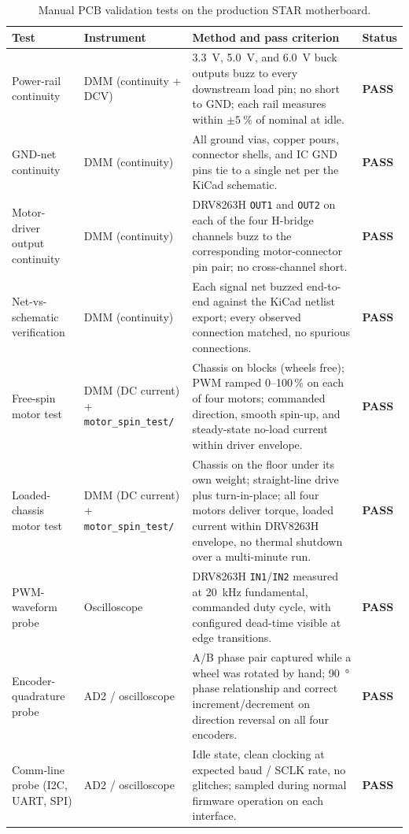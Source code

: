 \documentclass[11pt,letterpaper]{article}
\newcommand{\pass}{{\color{passgreen}\textbf{PASS}}}
\begin{document}
\begin{table}[H]
\centering
\caption{Manual PCB validation tests on the production STAR motherboard.}
\label{tab:pcbvalid}
\small
\setlength{\tabcolsep}{5pt}
\renewcommand{\arraystretch}{1.15}
\begin{tabularx}{\linewidth}{@{}%
  >{\raggedright\arraybackslash}p{3.0cm}%
  >{\raggedright\arraybackslash}p{3.0cm}%
  >{\raggedright\arraybackslash}X%
  >{\centering\arraybackslash}p{1.0cm}@{}}
\toprule
\textbf{Test} & \textbf{Instrument} & \textbf{Method and pass criterion} & \textbf{Status} \\
\midrule
Power-rail continuity
  & DMM (continuity + DCV)
  & \qty{3.3}{\volt}, \qty{5.0}{\volt}, and \qty{6.0}{\volt} buck outputs
    buzz to every downstream load pin; no short to GND; each rail measures
    within $\pm\qty{5}{\percent}$ of nominal at idle.
  & \pass{} \\[2pt]
GND-net continuity
  & DMM (continuity)
  & All ground vias, copper pours, connector shells, and IC GND pins tie
    to a single net per the KiCad schematic.
  & \pass{} \\[2pt]
Motor-driver output continuity
  & DMM (continuity)
  & DRV8263H \texttt{OUT1} and \texttt{OUT2} on each of the four H-bridge
    channels buzz to the corresponding motor-connector pin pair; no
    cross-channel short.
  & \pass{} \\[2pt]
Net-vs-schematic verification
  & DMM (continuity)
  & Each signal net buzzed end-to-end against the KiCad netlist export;
    every observed connection matched, no spurious connections.
  & \pass{} \\[2pt]
Free-spin motor test
  & DMM (DC current) + \texttt{motor\_spin\_test/}
  & Chassis on blocks (wheels free); PWM ramped 0--100\,\% on each of four
    motors; commanded direction, smooth spin-up, and steady-state no-load
    current within driver envelope.
  & \pass{} \\[2pt]
Loaded-chassis motor test
  & DMM (DC current) + \texttt{motor\_spin\_test/}
  & Chassis on the floor under its own weight; straight-line drive plus
    turn-in-place; all four motors deliver torque, loaded current within
    DRV8263H envelope, no thermal shutdown over a multi-minute run.
  & \pass{} \\[2pt]
PWM-waveform probe
  & Oscilloscope
  & DRV8263H \texttt{IN1}/\texttt{IN2} measured at \qty{20}{\kilo\hertz}
    fundamental, commanded duty cycle, with configured dead-time visible
    at edge transitions.
  & \pass{} \\[2pt]
Encoder-quadrature probe
  & AD2 / oscilloscope
  & A/B phase pair captured while a wheel was rotated by hand;
    \qty{90}{\degree} phase relationship and correct increment/decrement
    on direction reversal on all four encoders.
  & \pass{} \\[2pt]
Comm-line probe (I2C, UART, SPI)
  & AD2 / oscilloscope
  & Idle state, clean clocking at expected baud / SCLK rate, no glitches;
    sampled during normal firmware operation on each interface.
  & \pass{} \\
\bottomrule
\end{tabularx}
\end{table}
\end{document}
